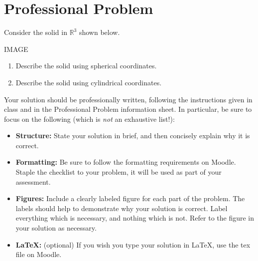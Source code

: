 \documentclass{ximera}
\begin{document}
\section{Professional Problem}

\begin{problem}
Consider the solid in $\mathbb{R}^3$ shown below.

IMAGE

\begin{enumerate}
\item Describe the solid using spherical coordinates.
\item Describe the solid using cylindrical coordinates.
\end{enumerate}

Your solution should be professionally written, following the instructions given in class and in the Professional Problem information sheet. In particular, be sure to focus on the following (which is \emph{not} an exhaustive list!):
\begin{itemize}
	\item \textbf{Structure:} State your solution in brief, and then concisely explain why it is correct.
	\item \textbf{Formatting:} Be sure to follow the formatting requirements on Moodle. Staple the checklist to your problem, it will be used as part of your assessment.
	\item \textbf{Figures:} Include a clearly labeled figure for each part of the problem. The labels should help to demonstrate why your solution is correct. Label everything which is necessary, and nothing which is not. Refer to the figure in your solution as necessary.
	\item \textbf{\LaTeX:} (optional) If you wish you type your solution in \LaTeX, use the tex file on Moodle.
\end{itemize}
\end{problem}
\end{document}
